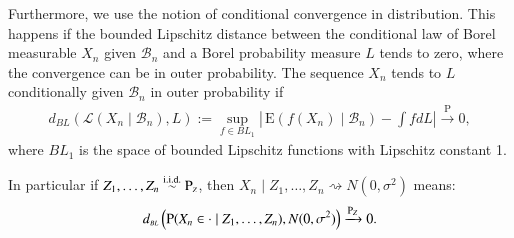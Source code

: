 Furthermore, we use the notion of conditional convergence in distribution. This happens if the bounded Lipschitz distance between the conditional law of Borel measurable $X_n$ given $\mathcal{B}_n$ and a Borel probability measure $L$ tends to zero, where the convergence can be in outer probability. The sequence $X_n$ tends to $L$ conditionally given $\mathcal{B}_n$ in outer probability if
\begin{align}\label{eq: formal definition conditional convergence chapter4}
d_{\scriptscriptstyle{ B L}}\left(\mathcal{L}\left(X_n \mid \mathcal{B}_n\right), L\right) :=\sup _{f \in B L_1}\left| \, \mathrm{E}\left(f\left(X_n\right) \mid \mathcal{B}_n\right)-\int f d L\right| \xrightarrow{\mathrm{P}} 0,
\end{align}
where $ B L_1$ is the space of bounded Lipschitz functions with Lipschitz constant 1.

In particular if $Z_1,\ldots,Z_n \overset{\text{i.i.d.}}{\sim} \mathrm{P}_{\scriptscriptstyle{Z}}$, then $X_n \mid Z_1,\ldots,Z_n \rightsquigarrow N(0,\sigma^2)$ means:
\begin{align}\label{eq: formal definition conditional convergence 1 chapter4}
	d_{\scriptscriptstyle{ B L}}\left( \mathrm{P} (X_n \in \cdot \mid Z_1,\ldots,Z_n), N(0,\sigma^2) \right) \xrightarrow{\mathrm{P}_{\scriptscriptstyle{Z}}} 0.
\end{align}

